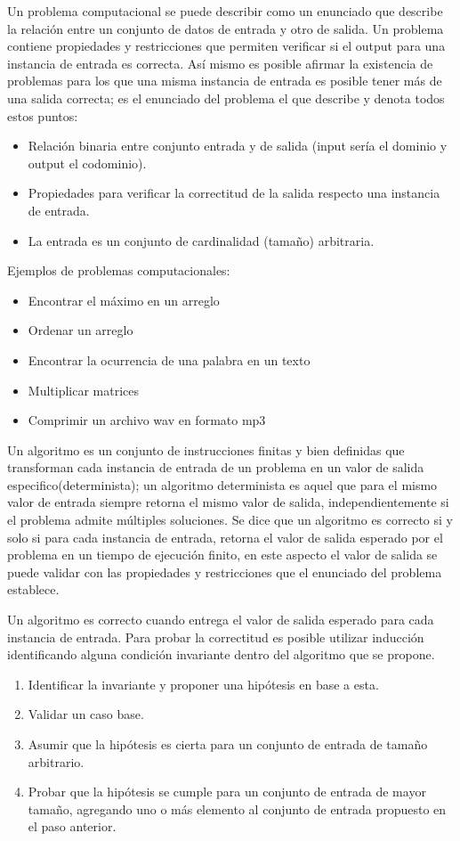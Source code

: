 \documentclass[12pt]{article}
\begin{document}
Un problema computacional se puede describir como un enunciado que describe la relación entre un conjunto de datos de entrada y otro de salida. Un problema contiene propiedades y restricciones que permiten verificar si el output para una instancia de entrada es correcta. Así mismo es posible afirmar la existencia de problemas para los que una misma instancia de entrada es posible tener más de una salida correcta; es el enunciado del problema el que describe y denota todos estos puntos:
\begin{itemize}
    \item Relación binaria entre conjunto entrada y de salida (input sería el dominio y output el codominio).
    \item Propiedades para verificar la correctitud de la salida respecto una instancia de entrada.
    \item La entrada es un conjunto de cardinalidad (tamaño) arbitraria.
\end{itemize}
Ejemplos de problemas computacionales:
\begin{itemize}
    \item Encontrar el máximo en un arreglo
    \item Ordenar un arreglo
    \item Encontrar la ocurrencia de una palabra en un texto
    \item Multiplicar matrices
    \item Comprimir un archivo wav en formato mp3
\end{itemize}

Un algoritmo es un conjunto de instrucciones finitas y bien definidas que transforman cada instancia de entrada de un problema en un valor de salida especifico(determinista); un algoritmo determinista es aquel que para el mismo valor de entrada siempre retorna el mismo valor de salida, independientemente si el problema admite múltiples soluciones. Se dice que un algoritmo es correcto si y solo si para cada instancia de entrada, retorna el valor de salida esperado por el problema en un tiempo de ejecución finito, en este aspecto el valor de salida se puede validar con las propiedades y restricciones que el enunciado del problema establece.

Un algoritmo es correcto cuando entrega el valor de salida esperado para cada instancia de entrada.
Para probar la correctitud es posible utilizar inducción identificando alguna condición invariante dentro del algoritmo que se propone.
\begin{enumerate}
    \item Identificar la invariante y proponer una hipótesis en base a esta.
    \item Validar un caso base.
    \item Asumir que la hipótesis es cierta para un conjunto de entrada de tamaño arbitrario.
    \item Probar que la hipótesis se cumple para un conjunto de entrada de mayor tamaño, agregando uno o más elemento al conjunto de entrada propuesto en el paso anterior.
\end{enumerate}
\end{document}

